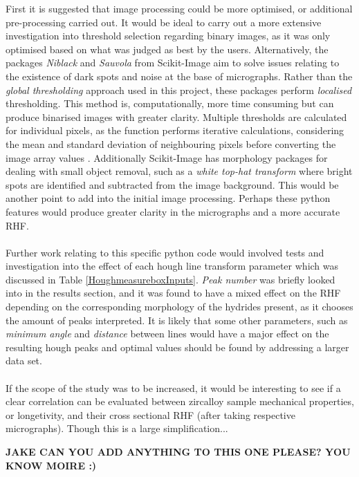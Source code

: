 \documentclass{article}
\begin{document}
First it is suggested that image processing could be more optimised, or additional pre-processing carried out. It would be ideal to carry out a more extensive investigation into threshold selection regarding binary images, as it was only optimised based on what was judged as best by the users. Alternatively, the packages \textit{Niblack} and \textit{Sauvola} from Scikit-Image aim to solve issues relating to the existence of dark spots and noise at the base of micrographs. Rather than the \textit{global thresholding} approach used in this project, these packages perform \textit{localised} thresholding. This method is, computationally, more time consuming but can produce binarised images with greater clarity. Multiple thresholds are calculated for individual pixels, as the function performs iterative calculations, considering the mean and standard deviation of neighbouring pixels before converting the image array values \cite{ScikitimageC}. Additionally Scikit-Image has morphology packages for dealing with small object removal, such as a \textit{white top-hat transform} where bright spots are identified and subtracted from the image background. This would be another point to add into the initial image processing. Perhaps these python features would produce greater clarity in the micrographs and a more accurate RHF.
\\
\\
Further work relating to this specific python code would involved tests and investigation into the effect of each hough line transform parameter which was discussed in Table \ref{HoughmeasureboxInputs}. \textit{Peak number} was briefly looked into in the results section, and it was found to have a mixed effect on the RHF depending on the corresponding morphology of the hydrides present, as it chooses the amount of peaks interpreted. It is likely that some other parameters, such as \textit{minimum angle} and \textit{distance} between lines would have a major effect on the resulting hough peaks and optimal values should be found by addressing a larger data set.
\\
\\
If the scope of the study was to be increased, it would be interesting to see if a clear correlation can be evaluated between zircalloy sample mechanical properties, or longetivity, and their cross sectional RHF (after taking  respective micrographs). Though this is a large simplification...

\textbf{JAKE CAN YOU ADD ANYTHING TO THIS ONE PLEASE? YOU KNOW MOIRE :)}
\end{document}
